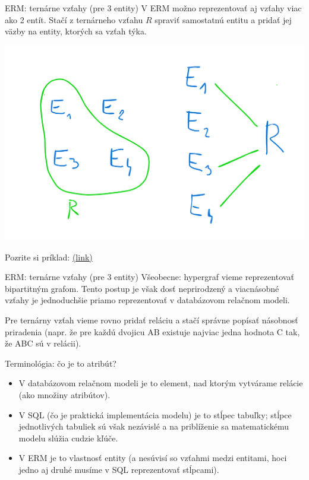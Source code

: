 \documentclass[12pt]{beamer}
\begin{document}
\begin{frame}[fragile]{ERM: ternárne vzťahy (pre 3 entity)}
V ERM možno reprezentovať aj vzťahy viac ako 2 entít.
Stačí z ternárneho vzťahu $R$ spraviť samostatnú entitu a pridať jej väzby na entity, ktorých sa vzťah týka.

\centerline{\includegraphics[scale=.15]{erm_ternary.png}}

Pozrite si príklad: \href{https://vertabelo.com/blog/ternary-relationship/}{(link)}\\
\end{frame}

\begin{frame}[fragile]{ERM: ternárne vzťahy (pre 3 entity)}
Všeobecne: hypergraf vieme reprezentovať bipartitným grafom.
Tento postup je však dosť neprirodzený a viacnásobné vzťahy je jednoduchšie priamo reprezentovať v databázovom relačnom modeli.

Pre ternárny vzťah vieme rovno pridať reláciu a stačí správne popísať násobnosť priradenia
(napr. že pre každú dvojicu AB existuje najviac jedna hodnota C tak, že ABC sú v relácii).
\end{frame}


\begin{frame}[fragile]{Terminológia: čo je to \alert{atribút}?}
\begin{itemize}
\item V  databázovom relačnom modeli je to \alert{ element}, nad ktorým vytvárame relácie (ako množiny atribútov).
\item V SQL (čo je praktická implementácia  modelu) je to \alert{stĺpec tabuľky}; 
  stĺpce jednotlivých tabuliek sú však nezávislé a na priblíženie sa matematickému modelu slúžia cudzie kľúče.
\item V ERM je to \alert{vlastnosť entity} (a nesúvisí so vzťahmi medzi entitami, hoci jedno aj druhé musíme v SQL reprezentovať stĺpcami). 
\end{itemize}
\end{frame}
\end{document}

